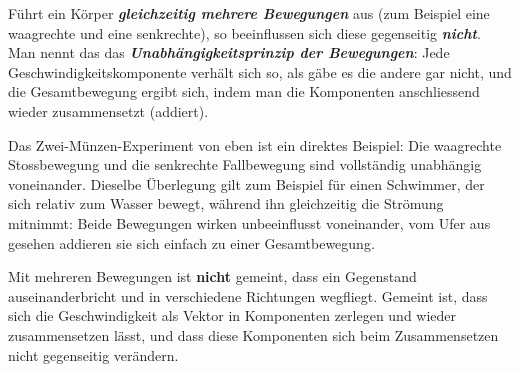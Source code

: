 \documentclass[addpoints,11pt,a4paper]{exam}
\begin{document}
\begin{theoriebox}
Führt ein Körper \textbf{\emph{gleichzeitig mehrere Bewegungen}} aus (zum
Beispiel eine waagrechte und eine senkrechte), so beeinflussen sich diese
gegenseitig \textbf{\emph{nicht}}. Man nennt das das
\textbf{\emph{Unabhängigkeitsprinzip der Bewegungen}}: Jede
Geschwindigkeitskomponente verhält sich so, als gäbe es die andere gar
nicht, und die Gesamtbewegung ergibt sich, indem man die Komponenten
anschliessend wieder zusammensetzt (addiert).

Das Zwei-Münzen-Experiment von eben ist ein direktes Beispiel: Die
waagrechte Stossbewegung und die senkrechte Fallbewegung sind vollständig
unabhängig voneinander. Dieselbe Überlegung gilt zum Beispiel für einen
Schwimmer, der sich relativ zum Wasser bewegt, während ihn gleichzeitig die
Strömung mitnimmt: Beide Bewegungen wirken unbeeinflusst voneinander, vom
Ufer aus gesehen addieren sie sich einfach zu einer Gesamtbewegung.

\begin{hinweisbox}
Mit \glqq mehreren Bewegungen\grqq{} ist \textbf{nicht} gemeint, dass ein
Gegenstand auseinanderbricht und in verschiedene Richtungen wegfliegt.
Gemeint ist, dass sich die Geschwindigkeit als Vektor in Komponenten
zerlegen und wieder zusammensetzen lässt, und dass diese Komponenten sich
beim Zusammensetzen nicht gegenseitig verändern.
\end{hinweisbox}
\end{theoriebox}
\end{document}
